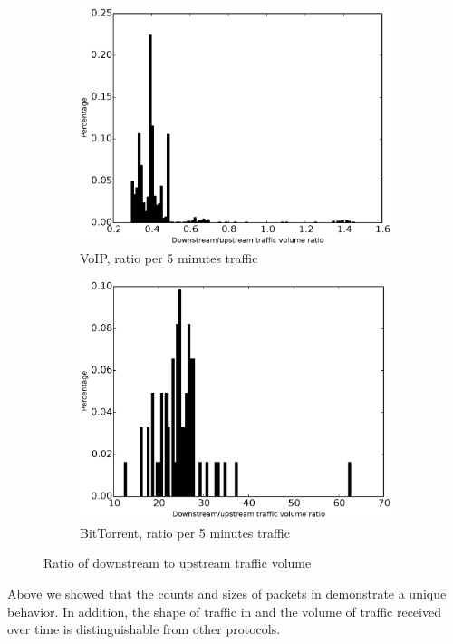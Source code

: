 \begin{figure}
\begin{subfigure}{0.32\linewidth}
\end{subfigure}
\begin{subfigure}{0.32\linewidth}
\includegraphics[width=\linewidth]{image/ratio_downstream_upstream_traffic_volume_voip.eps}
\caption{VoIP, ratio per 5 minutes traffic}
\label{ratio_downstream_upstream_traffic_volume_voip}
\end{subfigure}
\begin{subfigure}{0.32\linewidth}
\includegraphics[width=\linewidth]{image/ratio_downstream_upstream_traffic_volume_bittorrent.eps}
\caption{BitTorrent, ratio per 5 minutes traffic}
\label{ratio_downstream_upstream_traffic_volume_bittorrent}
\end{subfigure}
\caption{Ratio of downstream to upstream traffic volume}
\end{figure}
Above we showed that the counts and sizes of packets in \bc demonstrate a unique behavior. 
In addition, the shape of traffic in \bc and the volume of traffic received over time  is distinguishable from other protocols.


